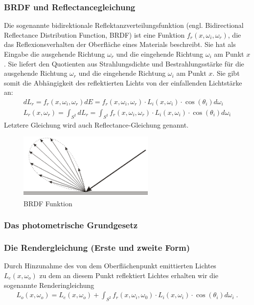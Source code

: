 \subsubsection{BRDF und Reflectancegleichung }
Die sogenannte bidirektionale Reflektanzverteilungsfunktion (engl. Bidirectional Reflectance Distribution Function, BRDF)
ist eine Funktion $f_r (x, \omega_i, \omega_r)$, die das Reflexionsverhalten der Oberfläche eines Materials beschreibt. 
Sie hat als Eingabe die ausgehende Richtung $\omega_r$ und die eingehende Richtung  $\omega_i$ am Punkt $x$. 
Sie  liefert den Quotienten aus Strahlungsdichte und Bestrahlungsstärke für die ausgehende Richtung $\omega_r$ und die eingehende Richtung  $\omega_i$ am Punkt $x$.
Sie gibt somit die Abhängigkeit des reflektierten Lichts von der einfallenden Lichtstärke an: 
\begin{align}
dL_r = f_r(x, \omega_i, \omega_r) dE =   f_r(x, \omega_i, \omega_r)  \cdot  L_i(x,\omega_i) \cdot  \cos(\theta_i) d \omega_i\\
L_r(x, \omega_r) = \int_{S^2} dL_r =    \int_{S^2}f_r (x, \omega_i, \omega_r) \cdot L_i(x, \omega_i) \cdot  \cos(\theta_i) d\omega_i
\end{align}
Letztere Gleichung wird auch Reflectance-Gleichung genannt.
 \begin{figure}[H]
    \centering
    \includegraphics[width=0.6\textwidth]{images/brdf2.png}
    \caption{BRDF Funktion}
    \label{fig:raytracin_brdf}
\end{figure}

\subsubsection{Das photometrische Grundgesetz}
 
\subsubsection{Die Rendergleichung (Erste und zweite Form)}

Durch Hinzunahme des von dem Oberflächenpunkt emittierten Lichtes $L_e(x, \omega_o)$ zu dem   an diesem Punkt reflektiert Lichtes erhalten wir die sogenannte Renderingleichung 
\begin{align}
L_o(x, \omega_o) = L_e(x, \omega_o)  + \displaystyle \int_{S^2}f_r (x, \omega_i, \omega_0) \cdot L_i(x, \omega_i)  \cdot  \cos(\theta_i) d\omega_i \; .
\end{align}


